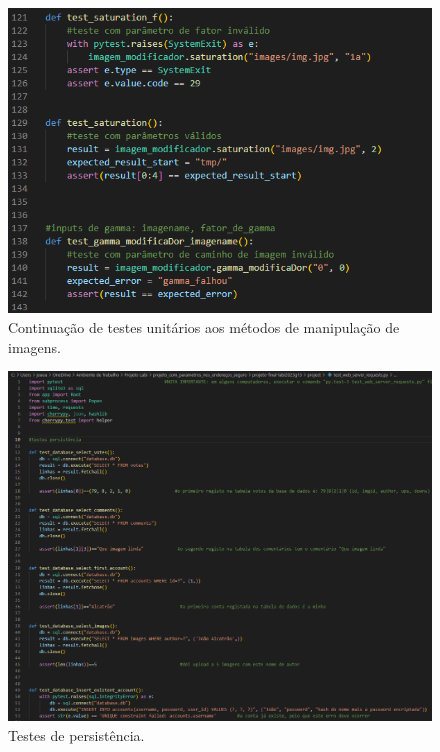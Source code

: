 \documentclass{report}
\begin{document}
    \begin{figure}[!hbtp]
        \centering 
        \includegraphics[scale=0.9]{Images_code/15 - testes 2.png}
        \caption{\label{Testes} Continuação de testes unitários aos métodos de manipulação de imagens. }
    \end{figure}

    \begin{figure}[!hbtp]
        \centering 
        \includegraphics[scale=0.4]{Images_code/15 - testes 4.png}
        \caption{\label{Testes}Testes de persistência.}
    \end{figure}
\end{document}
